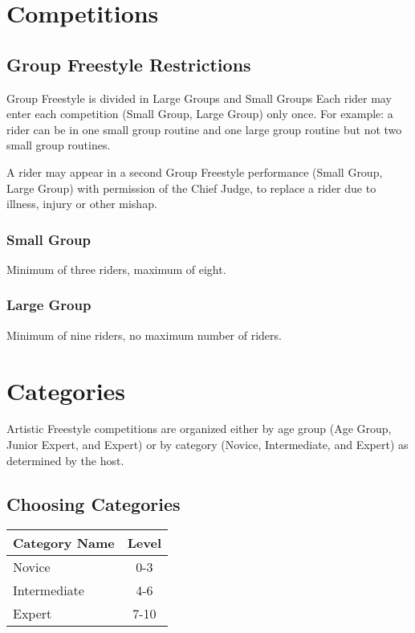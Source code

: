 \section{Competitions}

\subsection{Group Freestyle Restrictions}
Group Freestyle is divided in Large Groups and Small Groups 
Each rider may enter each competition (Small Group, Large Group) only once.
For example: a rider can be in one small group routine and one large group routine but not two small group routines.

A rider may appear in a second Group Freestyle performance (Small Group, Large Group) with permission of the Chief Judge, to replace a rider due to illness, injury or other mishap. 

\subsubsection{Small Group}
Minimum of three riders, maximum of eight.

\subsubsection{Large Group}
Minimum of nine riders, no maximum number of riders.

\section{Categories}

Artistic Freestyle competitions are organized either by age group (Age Group, Junior Expert, and Expert) or by category (Novice, Intermediate, and Expert) as determined by the host.

\subsection{Choosing Categories \label{subsec:freestyle-choosing_categories}}

\begin{tabular}{|l|c|}
\hline
\textbf{Category Name} & \textbf{Level} \\
\hline
Novice & 0-3 \\
\hline
Intermediate & 4-6 \\
\hline
Expert & 7-10 \\
\hline
\end{tabular}

